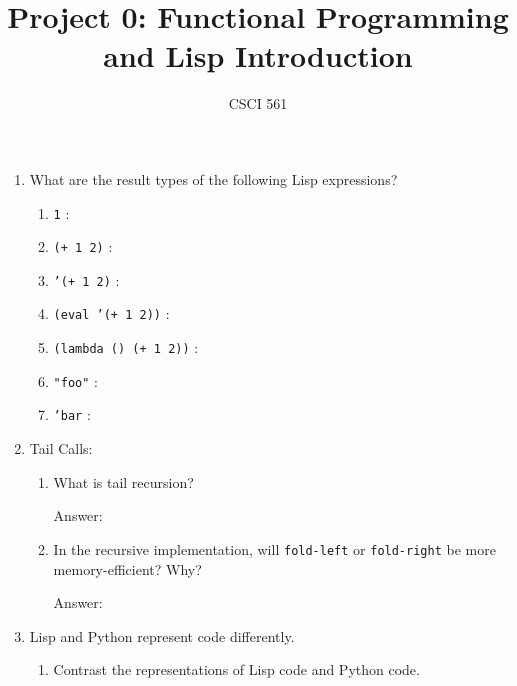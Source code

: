 \documentclass[12pt,letterpaper]{ntdhw}
\title{Project 0: Functional Programming and Lisp Introduction}
\author{CSCI 561}
\begin{document}
\pagestyle{fancyplain}

\maketitle
\thispagestyle{fancyplain}

\begin{enumerate}

  \item What are the result types of the following Lisp expressions?
  \begin{enumerate}
    \item {\tt 1} : \emph{
    }
    \item {\tt (+ 1 2)} : \emph{
    }
    \item {\tt '(+ 1 2)} : \emph{
    }
    \item {\tt (eval '(+ 1 2))} : \emph{
    }
    \item {\tt (lambda () (+ 1 2))} : \emph{
    }
    \item {\tt "foo"} : \emph{
    }
    \item {\tt 'bar} : \emph{
    }
  \end{enumerate}

  \item Tail Calls:
  \begin{enumerate}
    \item What is tail recursion?

    \begin{emph}
      Answer: %
    \end{emph}

    \item In the recursive implementation, will {\tt fold-left} or
    {\tt fold-right} be more memory-efficient?  Why?

    \begin{emph}
      Answer: %
    \end{emph}
  \end{enumerate}

  \item Lisp and Python represent code differently.

  \begin{enumerate}
    \item Contrast the representations of Lisp code and Python code.


\end{enumerate}
\end{enumerate}
\end{document}
